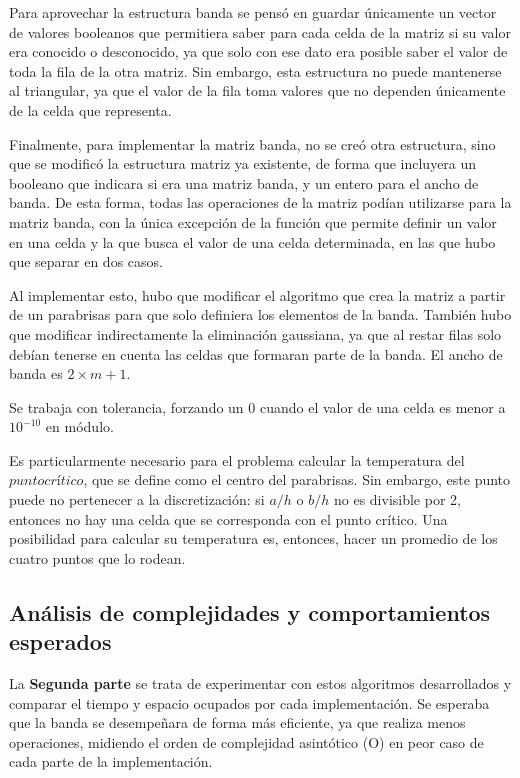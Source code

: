 \documentclass[a4paper]{article}
\begin{document}
Para aprovechar la estructura banda se pensó en guardar únicamente un vector de valores booleanos que permitiera saber para cada celda de la matriz si su valor era conocido o desconocido, ya que solo con ese dato era posible saber el valor de toda la fila de la otra matriz. Sin embargo, esta estructura no puede mantenerse al triangular, ya que el valor de la fila toma valores que no dependen únicamente de la celda que representa. 

Finalmente, para implementar la matriz banda, no se creó otra estructura, sino que se modificó la estructura matriz ya existente, de forma que incluyera un booleano que indicara si era una matriz banda, y un entero para el ancho de banda. De esta forma, todas las operaciones de la matriz podían utilizarse para la matriz banda, con la única excepción de la función que permite definir un valor en una celda y la que busca el valor de una celda determinada, en las que hubo que separar en dos casos.

Al implementar esto, hubo que modificar el algoritmo que crea la matriz a partir de un parabrisas para que solo definiera los elementos de la banda. También hubo que modificar indirectamente la eliminación gaussiana, ya que al restar filas solo debían tenerse en cuenta las celdas que formaran parte de la banda. El ancho de banda es $2 \times m + 1$.

Se trabaja con tolerancia, forzando un 0 cuando el valor de una celda es menor a $10^{-10}$ en módulo.

Es particularmente necesario para el problema calcular la temperatura del $punto cr$í$tico$, que se define como el centro del parabrisas. Sin embargo, este punto puede no pertenecer a la discretización: si $a/h$ o $b/h$ no es divisible por 2, entonces no hay una celda que se corresponda con el punto crítico. Una posibilidad para calcular su temperatura es, entonces, hacer un promedio de los cuatro puntos que lo rodean.

\subsection{Análisis de complejidades y comportamientos esperados}

La \textbf{Segunda parte} se trata de experimentar con estos algoritmos desarrollados y comparar el tiempo y espacio ocupados por cada implementación. Se esperaba que la banda se desempeñara de forma más eficiente, ya que realiza menos operaciones, midiendo el orden de complejidad asintótico (O) en peor caso de cada parte de la implementación. \newline 
 
\end{document}
